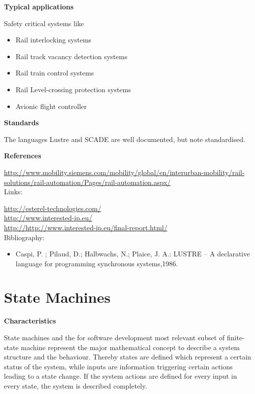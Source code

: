 \documentclass{./template/openetcs_report}
\begin{document}
	\textbf{Typical applications}

Safety critical systems like
\vspace{-10pt}
\begin{itemize}[topsep=2pt, partopsep=2pt,itemsep=2pt,parsep=2pt]
  \item Rail interlocking systems
  \item Rail track vacancy detection systems
  \item Rail train control systems
  \item Rail Level-crossing protection systems
  \item Avionic flight controller
\end{itemize}


	\textbf{Standards}

The languages Lustre and SCADE are well documented, but note standardised.

	\textbf{References}
	
\url{http://www.mobility.siemens.com/mobility/global/en/interurban-mobility/rail-solutions/rail-automation/Pages/rail-automation.aspx/} \\[4pt]	

Links:

\url{http://esterel-technologies.com/} \\[4pt]
\url{http://www.interested-ip.eu/}\\[4pt]
\url{http://http://www.interested-ip.eu/final-report.html/} \\[4pt]

Bibliography:

\begin{itemize}
\item Caspi, P. ; Pilaud, D.; Halbwachs,  N.; Plaice, J. A.: LUSTRE -- A declarative language for programming synchronous systems,1986.
\end{itemize}

\section{State Machines}


	\textbf{Characteristics}

State machines and the for software development most relevant subset of finite-state machine represent the major mathematical concept to describe a system structure and the behaviour. Thereby states are defined which represent a certain status of the system, while inputs are information triggering certain actions leading to a state change. If the system actions are defined for every input in every state, the system is described completely.
\end{document}
